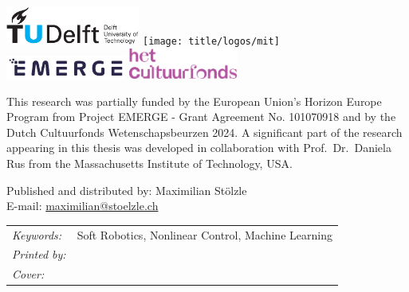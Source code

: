 \begin{titlepage}
\begin{center}
    \includegraphics[height=0.5in]{title/logos/tudelft}
    \hspace{3em}
    \texttt{[image: title/logos/mit]}\\
    \vspace{0.5em}
    \includegraphics[height=0.3in]{title/logos/emerge}
    \hspace{3em}
    \includegraphics[height=0.4in]{title/logos/cultuurfonds}
\end{center}
\vfill

\noindent This research was partially funded by the European Union’s Horizon Europe Program from Project EMERGE - Grant Agreement No. 101070918 and by the Dutch Cultuurfonds Wetenschapsbeurzen 2024.
A significant part of the research appearing in this thesis was developed in collaboration with Prof.\ Dr.\ Daniela Rus from the Massachusetts Institute of Technology, USA.

\noindent Published and distributed by: Maximilian Stölzle\\
E-mail: \href{mailto:maximilian@stoelzle.ch}{maximilian@stoelzle.ch}\\

\noindent
\begin{tabular}{@{}p{}@{}p{}}
  \textit{Keywords:} & Soft Robotics, Nonlinear Control, Machine Learning  \\[\medskipamount]
      \textit{Printed by:} &  \\[\medskipamount]
      \textit{Cover:} &  \\[\medskipamount]
\end{tabular}


\end{titlepage}
